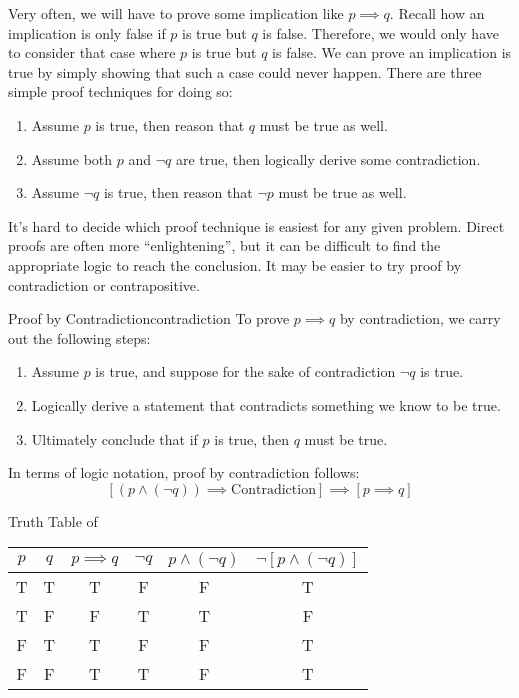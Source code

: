 \documentclass[12pt]{report}
\begin{document}
Very often, we will have to prove some implication like $p \implies q$. Recall how an implication is only false if $p$ is true but $q$ is false. Therefore, we would only have to consider that case where $p$ is true but $q$ is false. We can prove an implication is true by simply showing that such a case could never happen. There are three simple proof techniques for doing so:

\begin{enumerate}
    \item {} Assume $p$ is true, then reason that $q$ must be true as well.
    \item {} Assume both $p$ and $\neg q$ are true, then logically derive some contradiction.
    \item {} Assume $\neg q$ is true, then reason that $\neg p$ must be true as well.
\end{enumerate}

It's hard to decide which proof technique is easiest for any given problem. Direct proofs are often more ``enlightening'', but it can be difficult to find the appropriate logic to reach the conclusion. It may be easier to try proof by contradiction or contrapositive.

\begin{tecbox}{Proof by Contradiction}{contradiction}
    To prove $p \implies q$ by contradiction, we carry out the following steps:
    \begin{enumerate}
        \item Assume $p$ is true, and suppose for the sake of contradiction $\neg q$ is true.
        \item Logically derive a statement that contradicts something we know to be true.
        \item Ultimately conclude that if $p$ is true, then $q$ must be true.
    \end{enumerate}
\end{tecbox}

In terms of logic notation, proof by contradiction follows:
\[ \left[ \left( p \land (\neg q) \right) \implies \text{Contradiction} \right] \implies \left[ p \implies q \right]\]

\begin{exbox}{Truth Table of }{}
    \begin{center}\begin{tabular}{c | c || c | c | c | c }
        $p$ & $q$ & $p \implies q$ & $\neg q$ & $p \land (\neg q)$ & $\neg \left[ p \land (\neg q) \right]$ \\ \hline
        T & T & T & F & F & T \\
        T & F & F & T & T & F \\
        F & T & T & F & F & T \\
        F & F & T & T & F & T
    \end{tabular}\end{center}
\end{exbox}
\end{document}
